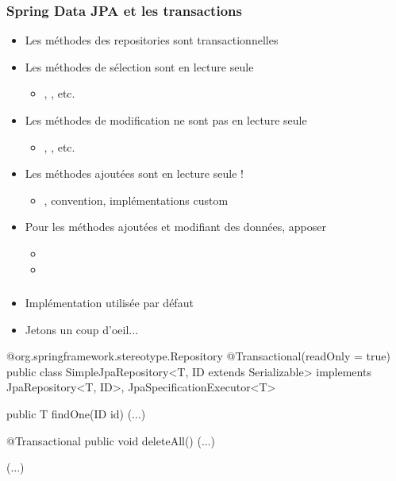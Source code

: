 \begin{frame}
 \frametitle{Spring Data JPA et les transactions}

 \begin{itemize}
  \item Les méthodes des repositories sont transactionnelles
  \item Les méthodes de sélection sont en lecture seule
   \begin{itemize}
    \item {}, , etc.
   \end{itemize}
  \item Les méthodes de modification ne sont pas en lecture seule
   \begin{itemize}
    \item {}, , etc.
   \end{itemize}
  \item Les méthodes ajoutées sont en lecture seule !
   \begin{itemize}
    \item {}, convention, implémentations custom
   \end{itemize}
  \item Pour les méthodes ajoutées et modifiant des données, apposer
   \begin{itemize}
    \item {}
    \item {} 
   \end{itemize}
 \end{itemize}
 
\end{frame}

\begin{frame}[fragile]
 \frametitle{}

 \begin{itemize}
  \item Implémentation utilisée par défaut
  \item Jetons un coup d'oeil...
 \end{itemize}

 \begin{javacode}
@org.springframework.stereotype.Repository
@Transactional(readOnly = true)
public class SimpleJpaRepository<T, ID extends Serializable> 
       implements JpaRepository<T, ID>, JpaSpecificationExecutor<T> {
       
  public T findOne(ID id) { (...) }

  @Transactional
  public void deleteAll() { (...) }
  
  (...)
       
}
 \end{javacode}
 
\end{frame}